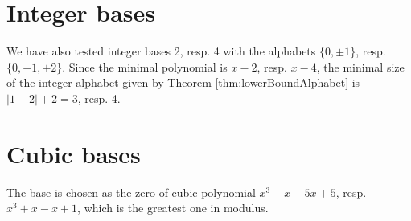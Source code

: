 \section{Integer bases}
We have also tested integer bases 2, resp. 4 with the alphabets $\{0,\pm 1\}$, resp. $\{0,\pm 1, \pm 2\}$. Since the minimal polynomial is $x-2$, resp. $x-4$, the minimal size of the integer alphabet given by Theorem \ref{thm:lowerBoundAlphabet} is $|1-2|+2=3$, resp. 4. 



\section{Cubic bases}
The base is chosen as the zero of cubic polynomial $x^3+x-5x+5$, resp. $x^3+x-x+1$, which is the greatest one in modulus. 

